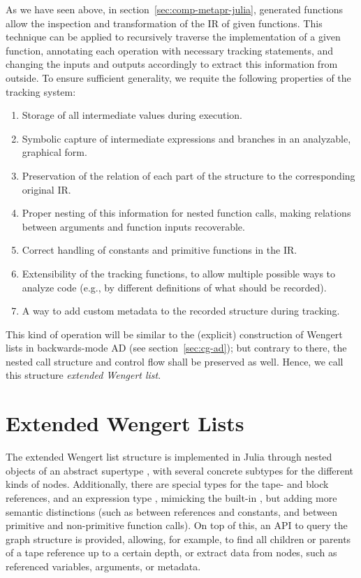 As we have seen above, in section~\ref{sec:comp-metapr-julia}, generated functions allow the
inspection and transformation of the IR of given functions.  This technique can be applied to
recursively traverse the implementation of a given function, annotating each operation with
necessary tracking statements, and changing the inputs and outputs accordingly to extract this
information from outside.  To ensure sufficient generality, we requite the following properties of
the tracking system:
\begin{enumerate}
  \firmlist
\item Storage of all intermediate values during execution.
\item Symbolic capture of intermediate expressions and branches in an analyzable, graphical form.
\item Preservation of the relation of each part of the structure to the corresponding original IR.
\item Proper nesting of this information for nested function calls, making relations between
  arguments and function inputs recoverable.
\item Correct handling of constants and primitive functions in the IR.
\item Extensibility of the tracking functions, to allow multiple possible ways to analyze code
  (e.g., by different definitions of what should be recorded).
\item A way to add custom metadata to the recorded structure during tracking.
\end{enumerate}
This kind of operation will be similar to the (explicit) construction of Wengert lists in
backwards-mode AD (see section~\ref{sec:cg-ad}); but contrary to there, the nested call structure
and control flow shall be preserved as well.  Hence, we call this structure \emph{extended Wengert
  list}.  

\section{Extended Wengert Lists}
\label{sec:exteded-wengert-lists}

The extended Wengert list structure is implemented in Julia through nested objects of an abstract
supertype , with several concrete subtypes for the different kinds of nodes.
Additionally, there are special types for the tape- and block references, and an expression type
, mimicking the built-in , but adding more semantic distinctions
(such as between references and constants, and between primitive and non-primitive function calls).
On top of this, an API to query the graph structure is provided, allowing, for example, to find all
children or parents of a tape reference up to a certain depth, or extract data from nodes, such as
referenced variables, arguments, or metadata.

